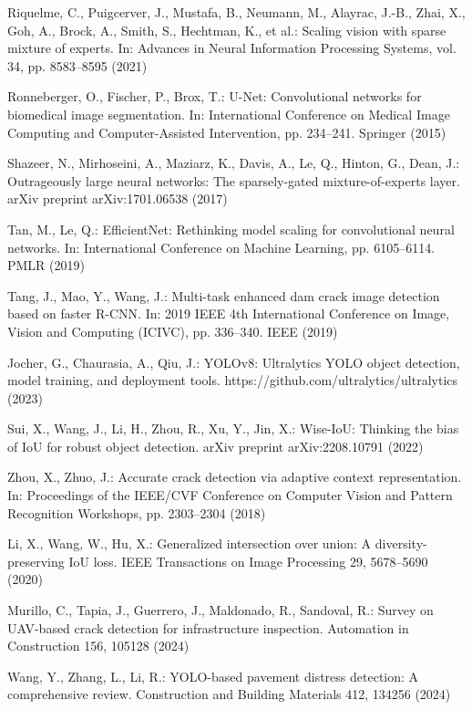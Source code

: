 \documentclass[twocolumn]{sn-jnl}
\begin{document}
		Riquelme, C., Puigcerver, J., Mustafa, B., Neumann, M., Alayrac, J.-B., Zhai, X., Goh, A., Brock, A., Smith, S., Hechtman, K., et al.: Scaling vision with sparse mixture of experts. In: Advances in Neural Information Processing Systems, vol. 34, pp. 8583–8595 (2021)
		
		Ronneberger, O., Fischer, P., Brox, T.: U-Net: Convolutional networks for biomedical image segmentation. In: International Conference on Medical Image Computing and Computer-Assisted Intervention, pp. 234–241. Springer (2015)
		
		Shazeer, N., Mirhoseini, A., Maziarz, K., Davis, A., Le, Q., Hinton, G., Dean, J.: Outrageously large neural networks: The sparsely-gated mixture-of-experts layer. arXiv preprint arXiv:1701.06538 (2017)
		
		Tan, M., Le, Q.: EfficientNet: Rethinking model scaling for convolutional neural networks. In: International Conference on Machine Learning, pp. 6105–6114. PMLR (2019)
		
		Tang, J., Mao, Y., Wang, J.: Multi-task enhanced dam crack image detection based on faster R-CNN. In: 2019 IEEE 4th International Conference on Image, Vision and Computing (ICIVC), pp. 336–340. IEEE (2019)
		
		Jocher, G., Chaurasia, A., Qiu, J.: YOLOv8: Ultralytics YOLO object detection, model training, and deployment tools. https://github.com/ultralytics/ultralytics (2023)

		Sui, X., Wang, J., Li, H., Zhou, R., Xu, Y., Jin, X.: Wise-IoU: Thinking the bias of IoU for robust object detection. arXiv preprint arXiv:2208.10791 (2022)

		Zhou, X., Zhuo, J.: Accurate crack detection via adaptive context representation. In: Proceedings of the IEEE/CVF Conference on Computer Vision and Pattern Recognition Workshops, pp. 2303–2304 (2018)

		Li, X., Wang, W., Hu, X.: Generalized intersection over union: A diversity-preserving IoU loss. IEEE Transactions on Image Processing 29, 5678–5690 (2020)

		Murillo, C., Tapia, J., Guerrero, J., Maldonado, R., Sandoval, R.: Survey on UAV-based crack detection for infrastructure inspection. Automation in Construction 156, 105128 (2024)

		Wang, Y., Zhang, L., Li, R.: YOLO-based pavement distress detection: A comprehensive review. Construction and Building Materials 412, 134256 (2024)
\end{document}
